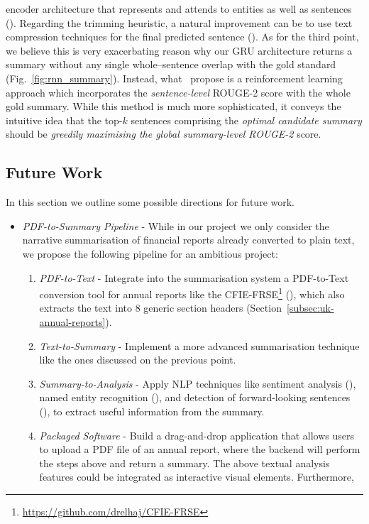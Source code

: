 \begin{itemize}
        encoder architecture that represents and attends to entities as well as sentences (\cite{Huang2021ExtractiveSC}).
        Regarding the trimming heuristic, a natural improvement can be to use text compression techniques for the final predicted sentence (\cite{ghalandari2022efficient, KNIGHT200291}).
        As for the third point, we believe this is very exacerbating reason why our GRU architecture returns a summary
        without any single whole--sentence overlap with the gold standard (Fig.~\ref{fig:rnn_summary}).
        Instead, what~\cite{zmandar-etal-2021-joint} propose is a reinforcement learning approach which incorporates
        the \emph{sentence-level} ROUGE-2 score with the whole gold summary.
        While this method is much more sophisticated, it conveys the intuitive idea that the top-$k$ sentences comprising the
        \emph{optimal candidate summary} should be \emph{greedily maximising the global summary-level ROUGE-2} score.
\end{itemize}

\subsection{Future Work}\label{subsec:future-work}
In this section we outline some possible directions for future work.
\begin{itemize}
    \item \emph{PDF-to-Summary Pipeline} - While in our project we only consider the narrative summarisation of
    financial reports already converted to plain text, we propose the following pipeline for an ambitious project:
    \begin{enumerate}
        \item \emph{PDF-to-Text} - Integrate into the summarisation system a PDF-to-Text conversion tool for annual
        reports like the CFIE-FRSE\footnote{\url{https://github.com/drelhaj/CFIE-FRSE}} (\cite{elhaj2019multilingual}), which
        also extracts the text into 8 generic section headers (Section~\ref{subsec:uk-annual-reports}).
        \item \emph{Text-to-Summary} - Implement a more advanced summarisation technique like the ones discussed on the previous point.
        \item \emph{Summary-to-Analysis} - Apply NLP techniques like sentiment analysis (\cite{araci2019finbert}), named entity recognition
        (\cite{zhang2022finbertmrc}), and detection of forward-looking sentences (\cite{stihec-etal-2021-preliminary}),
        to extract useful information from the summary.
        \item \emph{Packaged Software} - Build a drag-and-drop application that allows users to upload a PDF file of an
        annual report, where the backend will perform the steps above and return a summary.
        The above textual analysis features could be integrated as interactive visual elements.
        Furthermore,
    \end{enumerate}
\end{itemize}